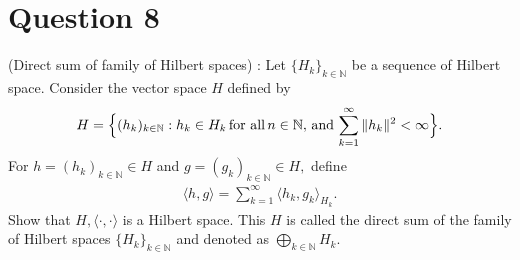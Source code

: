 \section{Question 8}

\horz
(Direct sum of family of Hilbert spaces) : Let $\{H_k\}_{k\in \mathbb N}$ be a sequence of Hilbert space. Consider the vector space $H$ defined by 
\begin{align*}
H = \Big\{ (h_k)_{k\in\mathbb N} : h_k\in H_k \mbox{\,for all\,} n\in\mathbb N, \,\mbox{and}\, \sum\limits_{k=1}^{\infty}\|h_k\|^2 < \infty\Big\}.
\end{align*}
For $h= (h_k)_{k\in\mathbb N} \in H$ and $g = (g_k)_{k\in\mathbb N}\in H,$ define
\begin{align*}
\langle h,g\rangle = \sum\limits_{k=1}^{\infty} \langle h_k,g_k\rangle_{H_k}.
\end{align*} 
Show that $H,\langle \cdot, \cdot \rangle$ is a Hilbert space. This $H$ is called the direct sum of the family of Hilbert spaces  $\{H_k\}_{k\in \mathbb N}$ and denoted as $\bigoplus\limits _{k\in\mathbb N} H_k.$
\horz

